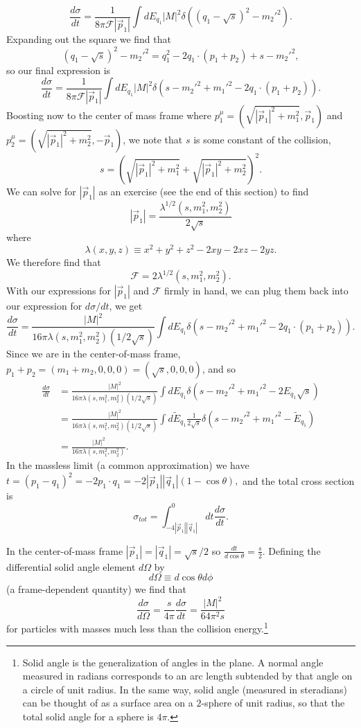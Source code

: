 $$\frac{d\sigma}{dt}=\frac{1}{8\pi \mathcal{F}|\vec p_1|}\int dE_{q_1}|M|^2 \delta((q_1-\sqrt{s})^2-{m_2'}^2).$$
Expanding out the square we find that
$$(q_1-\sqrt{s})^2-{m_2'}^2=q_1^2-2q_1\cdot(p_1+p_2)+s-{m_2'}^2,$$
so our final expression is
$$\frac{d\sigma}{dt}=\frac{1}{8\pi \mathcal{F}|\vec p_1|}\int dE_{q_1}|M|^2 \delta(s-{m_2'}^2 +{m_1'}^2-2q_1 \cdot(p_1+p_2)).$$
Boosting now to the center of mass frame where $p_1^\mu=(\sqrt{|\vec p_1|^2+m_1^2},\vec p_1)$ and $p_2^\mu=(\sqrt{|\vec p_1|^2+m_2^2},-\vec p_1)$, we note that $s$ is some constant of the collision,
$$s=\left(\sqrt{|\vec p_1|^2+m_1^2}+\sqrt{|\vec p_1|^2+m_2^2}\right)^2.$$
We can solve for $|\vec p_1|$ as an exercise (see the end of this section) to find
$$|\vec p_1|=\frac{\lambda^{1/2}(s,m_1^2,m_2^2)}{2\sqrt{s}}$$
where $$\lambda(x,y,z)\equiv x^2+y^2+z^2-2xy-2xz-2yz.$$ We therefore find that
$$\mathcal{F}=2\lambda^{1/2}(s,m_1^2,m_2^2).$$ With our expressions for $|\vec p_1|$ and $\mathcal{F}$ firmly in hand, we can plug them back into our expression for $d\sigma/dt$, we get
$$\frac{d\sigma}{dt}=\frac{|M|^2}{16\pi \lambda(s,m_1^2,m_2^2)(1/2\sqrt{s})}\int dE_{q_1} \delta(s-{m_2'}^2+{m_1'}^2-2q_1\cdot(p_1+p_2)).$$
Since we are in the center-of-mass frame, $p_1+p_2=(m_1+m_2,0,0,0)=(\sqrt{s},0,0,0)$, and so 
\begin{align*}
    \frac{d\sigma}{dt}&=\frac{|M|^2}{16\pi \lambda(s,m_1^2,m_2^2)(1/2\sqrt{s})}\int dE_{q_1} \delta(s-{m_2'}^2+{m_1'}^2-2E_{q_1}\sqrt{s})\\
    &=\frac{|M|^2}{16\pi \lambda(s,m_1^2,m_2^2)(1/2\sqrt{s})} \int d\tilde E_{q_1} \frac{1}{2\sqrt{s}} \delta(s-{m_2'}^2+{m_1'}^2-\tilde E_{q_1})\\
    &=\frac{|M|^2}{16\pi\lambda(s,m_1^2,m_2^2)}.
\end{align*}
In the massless limit (a common approximation) we have $t=(p_1-q_1)^2=-2p_1\cdot q_1 =-2|\vec p_1||\vec q_1|(1-\cos\theta),$ and the total cross section is
$$\sigma_{tot}=\int_{-4|\vec p_1||\vec q_1|}^0 dt \frac{d\sigma}{dt}.$$

In the center-of-mass frame $|\vec p_1|=|\vec q_1|=\sqrt{s}/2$ so $\frac{dt}{d\cos\theta}=\frac{s}{2}$. Defining the differential solid angle element $d\Omega$ by
$$d\Omega\equiv d\cos\theta d\phi$$ (a frame-dependent quantity) we find that
$$\frac{d\sigma}{d\Omega}=\frac{s}{4\pi}\frac{d\sigma}{dt}=\frac{|M|^2}{64\pi^2 s}$$
for particles with masses much less than the collision energy.\footnote{Solid angle is the generalization of angles in the plane. A normal angle measured in radians corresponds to an arc length subtended by that angle on a circle of unit radius. In the same way, solid angle (measured in steradians) can be thought of as a surface area on a $2$-sphere of unit radius, so that the total solid angle for a sphere is $4\pi$.}

